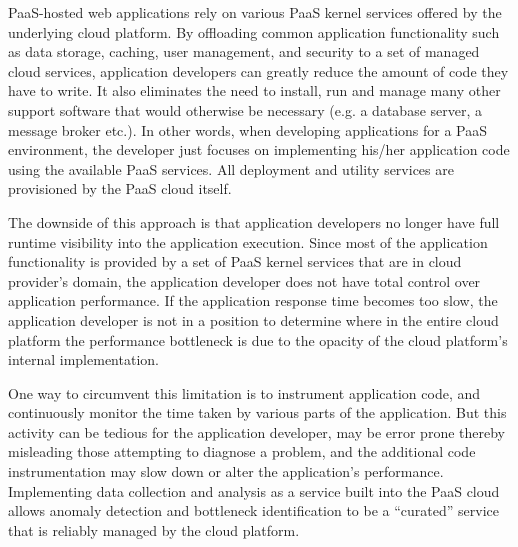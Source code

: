 PaaS-hosted web applications rely on various PaaS kernel services offered by the underlying
cloud platform. By offloading common application functionality such as data storage, caching,
user management, and security to a set of managed cloud services, application developers
can greatly reduce the amount of code they have to write. It also eliminates the need to install, run and
manage many other support software that would otherwise be necessary (e.g. a database server, 
a message broker etc.). In other words, when developing applications for a PaaS environment, the
developer just focuses on implementing his/her application code
using the available PaaS services. All deployment and utility services are provisioned 
by the PaaS cloud itself. 

The downside of this approach is that application developers no longer have full runtime visibility
into the application execution. Since most of the application functionality is provided by a set 
of PaaS kernel services that are in cloud provider's domain, the application
developer does not have total control over application performance. If the application 
response time becomes too slow, the application developer is not in a position to determine
where in the entire cloud platform the performance bottleneck is due to the opacity of the cloud
platform's internal implementation. 

One way to circumvent this 
limitation is to instrument application code, and continuously monitor the time taken by various
parts of the application. But this activity can be tedious for the application developer, 
may be error prone thereby misleading those attempting to
diagnose a problem, and
the additional code instrumentation may slow down or alter the application's
performance. 
Implementing data collection and analysis as a service built into the PaaS cloud allows 
anomaly detection and bottleneck identification to be a ``curated'' service that is 
reliably managed by the cloud platform.


